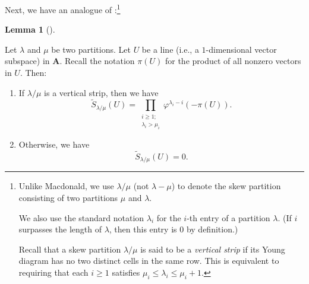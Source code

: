 \documentclass[numbers=enddot,12pt,final,onecolumn,notitlepage]{scrartcl}%
\numberwithin{exer}{section}
\theoremstyle{definition}
\newtheorem{lem}[theo]{Lemma}
\newenvironment{lemma}[1][]
{\begin{lem}[#1]\begin{leftbar}}
{\end{leftbar}\end{lem}}
\let\prodnonlimits\prod
\renewcommand{\prod}{\prodnonlimits\limits}
\theoremstyle{plainsl}
\begin{document}
Next, we have an analogue of \cite[(7.22)]{Macdon92}:\footnote{Unlike
Macdonald, we use $\lambda/\mu$ (not $\lambda-\mu$) to denote the skew
partition consisting of two partitions $\mu$ and $\lambda$.
\par
We also use the standard notation $\lambda_{i}$ for the $i$-th entry of a
partition $\lambda$. (If $i$ surpasses the length of $\lambda$, then this
entry is $0$ by definition.)
\par
Recall that a skew partition $\lambda/\mu$ is said to be a \emph{vertical
strip} if its Young diagram has no two distinct cells in the same row. This is
equivalent to requiring that each $i\geq1$ satisfies $\mu_{i}\leq\lambda
_{i}\leq\mu_{i}+1$.}

\begin{lemma}
\label{lem.Stil.1}Let $\lambda$ and $\mu$ be two partitions. Let $U$ be a line
(i.e., a $1$-dimensional vector subspace) in $\mathbf{A}$. Recall the notation
$\pi\left(  U\right)  $ for the product of all nonzero vectors in $U$. Then:

\begin{enumerate}
\item[\textbf{(a)}] If $\lambda/\mu$ is a vertical strip, then we have%
\begin{equation}
\widetilde{S}_{\lambda/\mu}\left(  U\right)  =\prod_{\substack{i\geq
1;\\\lambda_{i}>\mu_{i}}}\varphi^{\lambda_{i}-i}\left(  -\pi\left(  U\right)
\right)  . \label{eq.Stilde.1-dim}%
\end{equation}


\item[\textbf{(b)}] Otherwise, we have%
\begin{equation}
\widetilde{S}_{\lambda/\mu}\left(  U\right)  =0. \label{eq.Stilde.1-dim.0}%
\end{equation}

\end{enumerate}
\end{lemma}
\end{document}
